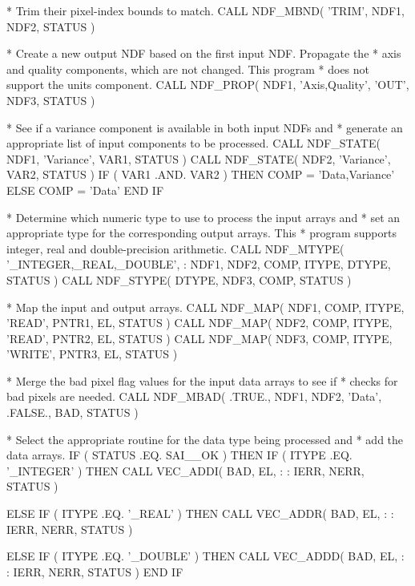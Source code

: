 \documentclass[twoside,11pt,nolof]{starlink}
\begin{document}
\begin{terminalv}
*  Trim their pixel-index bounds to match.
      CALL NDF_MBND( 'TRIM', NDF1, NDF2, STATUS )

*  Create a new output NDF based on the first input NDF. Propagate the
*  axis and quality components, which are not changed. This program
*  does not support the units component.
      CALL NDF_PROP( NDF1, 'Axis,Quality', 'OUT', NDF3, STATUS )

*  See if a variance component is available in both input NDFs and
*  generate an appropriate list of input components to be processed.
      CALL NDF_STATE( NDF1, 'Variance', VAR1, STATUS )
      CALL NDF_STATE( NDF2, 'Variance', VAR2, STATUS )
      IF ( VAR1 .AND. VAR2 ) THEN
         COMP = 'Data,Variance'
      ELSE
         COMP = 'Data'
      END IF

*  Determine which numeric type to use to process the input arrays and
*  set an appropriate type for the corresponding output arrays. This
*  program supports integer, real and double-precision arithmetic.
      CALL NDF_MTYPE( '_INTEGER,_REAL,_DOUBLE',
     :                NDF1, NDF2, COMP, ITYPE, DTYPE, STATUS )
      CALL NDF_STYPE( DTYPE, NDF3, COMP, STATUS )

*  Map the input and output arrays.
      CALL NDF_MAP( NDF1, COMP, ITYPE, 'READ', PNTR1, EL, STATUS )
      CALL NDF_MAP( NDF2, COMP, ITYPE, 'READ', PNTR2, EL, STATUS )
      CALL NDF_MAP( NDF3, COMP, ITYPE, 'WRITE', PNTR3, EL, STATUS )

*  Merge the bad pixel flag values for the input data arrays to see if
*  checks for bad pixels are needed.
      CALL NDF_MBAD( .TRUE., NDF1, NDF2, 'Data', .FALSE., BAD, STATUS )

*  Select the appropriate routine for the data type being processed and
*  add the data arrays.
      IF ( STATUS .EQ. SAI__OK ) THEN
         IF ( ITYPE .EQ. '_INTEGER' ) THEN
            CALL VEC_ADDI( BAD, EL, %
     :                     %
     :                     IERR, NERR, STATUS )

         ELSE IF ( ITYPE .EQ. '_REAL' ) THEN
            CALL VEC_ADDR( BAD, EL, %
     :                     %
     :                     IERR, NERR, STATUS )

         ELSE IF ( ITYPE .EQ. '_DOUBLE' ) THEN
            CALL VEC_ADDD( BAD, EL, %
     :                     %
     :                     IERR, NERR, STATUS )
         END IF


\end{terminalv}
\end{document}
